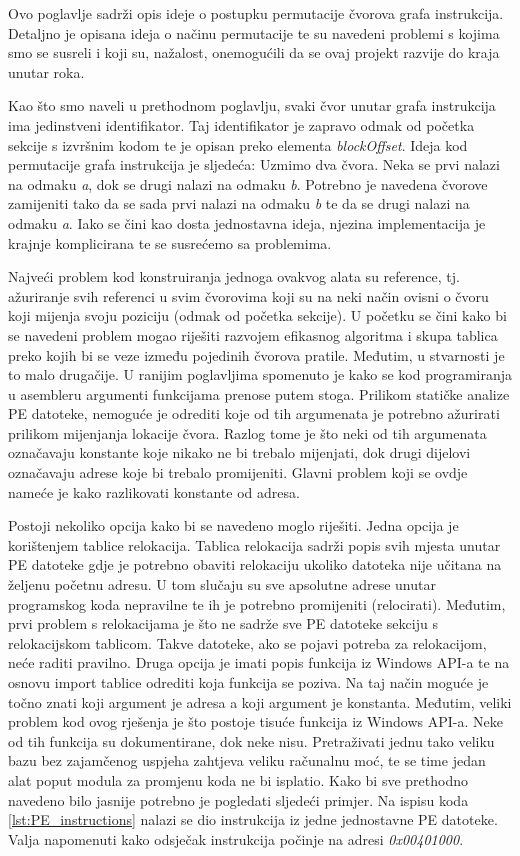 \documentclass[times, utf8, diplomski, numeric]{fer}
\begin{document}
Ovo poglavlje sadrži opis ideje o postupku permutacije čvorova grafa
instrukcija. Detaljno je opisana ideja o načinu permutacije te su navedeni
problemi s kojima smo se susreli i koji su, nažalost, onemogućili da se ovaj
projekt razvije do kraja unutar roka.

Kao što smo naveli u prethodnom poglavlju, svaki čvor unutar grafa instrukcija
ima jedinstveni identifikator. Taj identifikator je zapravo odmak od početka
sekcije s izvršnim kodom te je opisan preko elementa \emph{blockOffset}. Ideja
kod permutacije grafa instrukcija je sljedeća: Uzmimo dva čvora. Neka se prvi
nalazi na odmaku \emph{a}, dok se drugi nalazi na odmaku \emph{b}. Potrebno je
navedena čvorove zamijeniti tako da se sada prvi nalazi na odmaku \emph{b} te
da se drugi nalazi na odmaku \emph{a}. Iako se čini kao dosta jednostavna
ideja, njezina implementacija je krajnje komplicirana te se susrećemo sa
problemima.

Najveći problem kod konstruiranja jednoga ovakvog alata su reference, tj.
ažuriranje svih referenci u svim čvorovima koji su na neki način ovisni o čvoru
koji mijenja svoju poziciju (odmak od početka sekcije). U početku se čini kako
bi se navedeni problem mogao riješiti razvojem efikasnog algoritma i skupa
tablica preko kojih bi se veze između pojedinih čvorova pratile. Međutim, u
stvarnosti je to malo drugačije. U ranijim poglavljima spomenuto je kako se kod
programiranja u asembleru argumenti funkcijama prenose putem stoga. Prilikom
statičke analize PE datoteke, nemoguće je odrediti koje od tih argumenata je
potrebno ažurirati prilikom mijenjanja lokacije čvora. Razlog tome je što neki
od tih argumenata označavaju konstante koje nikako ne bi trebalo mijenjati, dok
drugi dijelovi označavaju adrese koje bi trebalo promijeniti. Glavni problem
koji se ovdje nameće je kako razlikovati konstante od adresa. 

Postoji nekoliko opcija kako bi se navedeno moglo riješiti. Jedna opcija je
korištenjem tablice relokacija. Tablica relokacija sadrži popis svih mjesta
unutar PE datoteke gdje je potrebno obaviti relokaciju ukoliko datoteka nije
učitana na željenu početnu adresu. U tom slučaju su sve apsolutne adrese unutar
programskog koda nepravilne te ih je potrebno promijeniti (relocirati).
Međutim, prvi problem s relokacijama je što ne sadrže sve PE datoteke sekciju
s relokacijskom tablicom. Takve datoteke, ako se pojavi potreba za
relokacijom, neće raditi pravilno. Druga opcija je imati popis funkcija iz
Windows API-a te na osnovu import tablice odrediti koja funkcija se poziva. Na
taj način moguće je točno znati koji argument je adresa a koji argument je
konstanta. Međutim, veliki problem kod ovog rješenja je što postoje tisuće
funkcija iz Windows API-a. Neke od tih funkcija su dokumentirane, dok neke
nisu. Pretraživati jednu tako veliku bazu bez zajamčenog uspjeha zahtjeva
veliku računalnu moć, te se time jedan alat poput modula za promjenu koda ne bi
isplatio. Kako bi sve prethodno navedeno bilo jasnije potrebno je pogledati
sljedeći primjer. Na ispisu koda \ref{lst:PE_instructions} nalazi se dio
instrukcija iz jedne jednostavne PE datoteke. Valja napomenuti kako odsječak 
instrukcija počinje na adresi \emph{0x00401000}.
\end{document}
